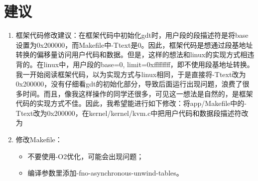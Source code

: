 \documentclass[12pt,a4paper,UTF8]{article}
\begin{document}
\section{建议}
\begin{enumerate}
	\item 框架代码修改建议：在框架代码中初始化gdt时，用户段的段描述符是将base设置为0x200000，而Makefile中-Ttext是0。因此，框架代码是想通过段基地址转换的偏移量访问用户代码和数据。但是，这样的想法和linux的实现方式相违背的。在linux中，用户段的base=0, limit=0xffffffff，即不使用段基地址转换。我一开始阅读框架代码，以为实现方式与linux相同，于是直接将-Ttext改为0x200000，没有仔细看gdt的初始化部分，导致后面运行出现问题，浪费了很多时间。而且，像我这样操作的同学还很多，可见这一想法是自然的，是框架代码的实现方式不佳。因此，我希望能进行如下修改：将app/Makefile中的-Ttext改为0x200000，在kernel/kernel/kvm.c中把用户代码和数据段描述符改为
	
	\item 修改Makefile：
	\begin{itemize}
		\item 不要使用-O2优化，可能会出现问题；
		\item 编译参数里添加-fno-asynchronous-unwind-tables。
	\end{itemize}
\end{enumerate}
\end{document}
